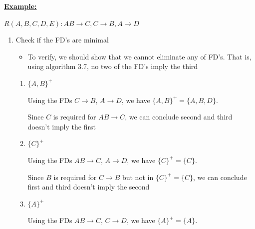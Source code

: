 \documentclass[12pt]{article}
\begin{document}
\begin{enumerate}[1.]
\begin{enumerate}[a)]
\begin{itemize}
            \bigskip

            \underline{\textbf{Example:}}

            \bigskip

            $R(A,B,C,D,E): AB \to C, C \to B, A \to D$

            \bigskip

            \begin{enumerate}[1.]
                \item Check if the FD's are minimal
                \begin{itemize}
                    \item To verify, we should show that we cannot eliminate any of FD's.
                    That is, using algorithm 3.7, no two of the FD's imply the third
                \end{itemize}

                \bigskip

                \color{red}
                \begin{enumerate}[1)]
                    \item $\{A,B\}^+$

                    \bigskip

                    Using the FDs $C \to B$, $A \to D$, we have $\{A,B\}^+ = \{A,B,D\}$.

                    \bigskip

                    Since $C$ is required for $AB \to C$, we can conclude second
                    and third doesn't imply the first

                    \item $\{C\}^+$

                    \bigskip

                    Using the FDs $AB \to C$, $A \to D$, we have $\{C\}^+ = \{C\}$.

                    \bigskip

                    Since $B$ is required for $C \to B$ but not in $\{C\}^+ = \{C\}$, we can conclude first
                    and third doesn't imply the second

                    \item $\{A\}^+$

                    \bigskip

                    Using the FDs $AB \to C$, $C \to D$, we have $\{A\}^+ = \{A\}$.

                    \bigskip


\end{enumerate}
\end{enumerate}
\end{itemize}
\end{enumerate}
\end{enumerate}
\end{document}
